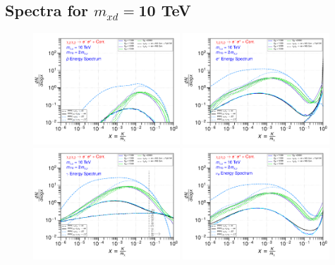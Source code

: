 \documentclass[epj,nopacs,fleqn]{svjour}
\begin{document}
\subsection{Spectra for $m_{xd}=$10 TeV}
\begin{figure}[!b]
	\centering
	\subfigure
	{ \includegraphics[width=0.49\textwidth]{Fig/xdxd_ee_eeZ_eveW/10_antiprotons_ee_eeZ_eveW_10.pdf}}
	\subfigure
	{ \includegraphics[width=0.49\textwidth]{Fig/xdxd_ee_eeZ_eveW/10_positrons_ee_eeZ_eveW_10.pdf}}
	\subfigure
	{ \includegraphics[width=0.49\textwidth]{Fig/xdxd_ee_eeZ_eveW/10_gammas_ee_eeZ_eveW_10.pdf}}
	\subfigure
	{ \includegraphics[width=0.49\textwidth]{Fig/xdxd_ee_eeZ_eveW/10_neutrinos_e_ee_eeZ_eveW_10.pdf}}

\end{figure}
\end{document}
